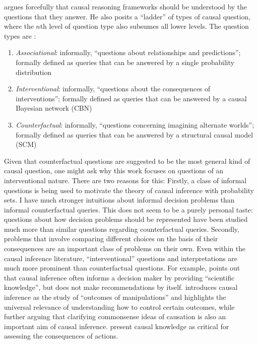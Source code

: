 \citet{pearl_book_2018} argues forcefully that causal reasoning frameworks should be understood by the questions that they answer. He also posits a ``ladder'' of types of causal question, where the $n$th level of question type also subsumes all lower levels. The question types are \citep{barenboim_foundations_2020}:
\begin{enumerate}
    \item \emph{Associational}: informally, ``questions about relationships and predictions''; formally defined as queries that can be answered by a single probability distribution
    \item \emph{Interventional}: informally, ``questions about the consequences of interventions''; formally defined as queries that can be answered by a causal Bayesian network (CBN)
    \item \emph{Counterfactual}: informally, ``questions concerning imagining alternate worlds''; formally defined as queries that can be answered by a structural causal model (SCM)
\end{enumerate}

Given that counterfactual questions are suggested to be the most general kind of causal question, one might ask why this work focuses on questions of an interventional nature. There are two reasons for this: Firstly, a class of informal questions is being used to motivate the theory of causal inference with probability sets. I have much stronger intuitions about informal decision problems than informal counterfactual queries. This does not seem to be a purely personal taste: questions about how decision problems should be represented have been studied much more than similar questions regarding counterfactual queries. Secondly, problems that involve comparing different choices on the basis of their consequences are an important class of problems on their own. Even within the causal inference literature, ``interventional'' questions and interpretations are much more prominent than counterfactual questions. For example, \citet{rubin_causal_2005} points out that causal inference often informs a decision maker by providing ``scientific knowledge'', but does not make recommendations by itself. \citep{imbens_causal_2015} introduces causal inference as the study of ``outcomes of manipulations'' and \citep{spirtes_causation_1993} highlights the universal relevance of understanding how to control certain outcomes, while further arguing that clarifying commonsense ideas of causation is also an important aim of causal inference. \citet{hernan_whatif_2020} present causal knowledge as critical for assessing the consequences of actions.

